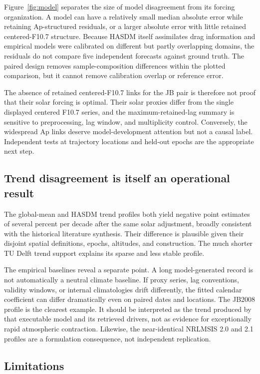 \documentclass[11pt]{article}
\begin{document}
Figure~\ref{fig:model} separates the size of model disagreement from its
forcing organization.  A model can have a relatively small median absolute
error while retaining Ap-structured residuals, or a larger absolute error with
little retained centered-F10.7 structure.  Because HASDM itself assimilates
drag information and empirical models were calibrated on different but partly
overlapping domains, the residuals do not compare five independent forecasts
against ground truth.  The paired design removes sample-composition differences
within the plotted comparison, but it cannot remove calibration overlap or
reference error.

The absence of retained centered-F10.7 links for the JB pair is therefore not
proof that their solar forcing is optimal.  Their solar proxies differ from the
single displayed centered F10.7 series, and the maximum-retained-lag summary is
sensitive to preprocessing, lag window, and multiplicity control.  Conversely,
the widespread Ap links deserve model-development attention but not a causal
label.  Independent tests at trajectory locations and held-out epochs are the
appropriate next step.

\subsection{Trend disagreement is itself an operational result}

The global-mean and HASDM trend profiles both yield negative point estimates
of several percent per decade after the same solar adjustment, broadly consistent with
the historical literature synthesis.  Their difference is plausible given
their disjoint spatial definitions, epochs, altitudes, and construction.
The much shorter TU Delft trend support explains its sparse and less stable
profile.

The empirical baselines reveal a separate point.  A long model-generated record
is not automatically a neutral climate baseline.  If proxy series, lag
conventions, validity windows, or internal climatologies drift differently,
the fitted calendar coefficient can differ dramatically even on paired dates
and locations.  The JB2008 profile is the clearest example.  It should be
interpreted as the trend produced by that executable model and its retrieved
drivers, not as evidence for exceptionally rapid atmospheric contraction.
Likewise, the near-identical NRLMSIS 2.0 and 2.1 profiles are a formulation
consequence, not independent replication.

\subsection{Limitations}
\end{document}

